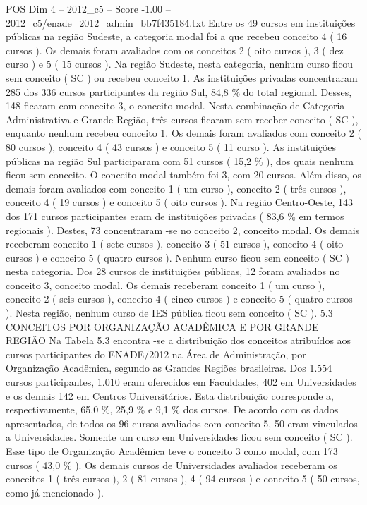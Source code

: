 \begin{textsample}{POS Dim 4 – 2012\_c5 – Score -1.00 – 2012\_c5/enade\_2012\_admin\_bb7f435184.txt}
Entre os 49 cursos em instituições públicas na região Sudeste, a categoria modal foi a que recebeu conceito 4 ( 16 cursos ).
Os demais foram avaliados com os conceitos 2 ( oito cursos ), 3 ( dez curso ) e 5 ( 15 cursos ).
Na região Sudeste, nesta categoria, nenhum curso ficou sem conceito ( SC ) ou recebeu conceito 1.
As instituições privadas concentraram 285 dos 336 cursos participantes da região Sul, 84,8 \% do total regional.
Desses, 148 ficaram com conceito 3, o conceito modal.
Nesta combinação de Categoria Administrativa e Grande Região, três cursos ficaram sem receber conceito ( SC ), enquanto nenhum recebeu conceito 1.
Os demais foram avaliados com conceito 2 ( 80 cursos ), conceito 4 ( 43 cursos ) e conceito 5 ( 11 curso ).
As instituições públicas na região Sul participaram com 51 cursos ( 15,2 \% ), dos quais nenhum ficou sem conceito.
O conceito modal também foi 3, com 20 cursos.
Além disso, os demais foram avaliados com conceito 1 ( um curso ), conceito 2 ( três cursos ), conceito 4 ( 19 cursos ) e conceito 5 ( oito cursos ).
Na região Centro-Oeste, 143 dos 171 cursos participantes eram de instituições privadas ( 83,6 \% em termos regionais ).
Destes, 73 concentraram -se no conceito 2, conceito modal.
Os demais receberam conceito 1 ( sete cursos ), conceito 3 ( 51 cursos ), conceito 4 ( oito cursos ) e conceito 5 ( quatro cursos ).
Nenhum curso ficou sem conceito ( SC ) nesta categoria.
Dos 28 cursos de instituições públicas, 12 foram avaliados no conceito 3, conceito modal.
Os demais receberam conceito 1 ( um curso ), conceito 2 ( seis cursos ), conceito 4 ( cinco cursos ) e conceito 5 ( quatro cursos ).
Nesta região, nenhum curso de IES pública ficou sem conceito ( SC ). 5.3 CONCEITOS POR ORGANIZAÇÃO ACADÊMICA E POR GRANDE REGIÃO Na Tabela 5.3 encontra -se a distribuição dos conceitos atribuídos aos cursos participantes do ENADE/2012 na Área de Administração, por Organização Acadêmica, segundo as Grandes Regiões brasileiras.
Dos 1.554 cursos participantes, 1.010 eram oferecidos em Faculdades, 402 em Universidades e os demais 142 em Centros Universitários.
Esta distribuição corresponde a, respectivamente, 65,0 \%, 25,9 \% e 9,1 \% dos cursos.
De acordo com os dados apresentados, de todos os 96 cursos avaliados com conceito 5, 50 eram vinculados a Universidades.
Somente um curso em Universidades ficou sem conceito ( SC ).
Esse tipo de Organização Acadêmica teve o conceito 3 como modal, com 173 cursos ( 43,0 \% ).
Os demais cursos de Universidades avaliados receberam os conceitos 1 ( três cursos ), 2 ( 81 cursos ), 4 ( 94 cursos ) e conceito 5 ( 50 cursos, como já mencionado ).

\end{textsample}
